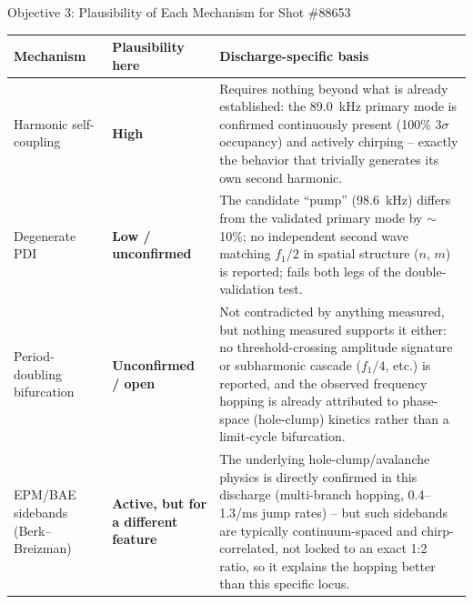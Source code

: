 \documentclass[aspectratio=169]{beamer}
\begin{document}
\begin{frame}{Objective 3: Plausibility of Each Mechanism for Shot \#88653}
    \scriptsize
    \renewcommand{\arraystretch}{1.25}
    \setlength{\tabcolsep}{4pt}
    \begin{tabularx}{\textwidth}{@{}p{2.4cm}p{2.3cm}X@{}}
        \toprule
        \textbf{Mechanism} & \textbf{Plausibility here} & \textbf{Discharge-specific basis} \\
        \midrule
        Harmonic self-coupling &
        \textcolor{green!50!black}{\textbf{High}} &
        Requires nothing beyond what is already established: the \SI{89.0}{\kilo\hertz} primary mode is confirmed continuously present (100\% $3\sigma$ occupancy) and actively chirping -- exactly the behavior that trivially generates its own second harmonic. \\
        \addlinespace
        Degenerate PDI &
        \textcolor{orange!80!black}{\textbf{Low / unconfirmed}} &
        The candidate ``pump'' (\SI{98.6}{\kilo\hertz}) differs from the validated primary mode by $\sim$10\%; no independent second wave matching $f_1/2$ in spatial structure ($n$, $m$) is reported; fails both legs of the double-validation test. \\
        \addlinespace
        Period-doubling bifurcation &
        \textcolor{orange!80!black}{\textbf{Unconfirmed / open}} &
        Not contradicted by anything measured, but nothing measured supports it either: no threshold-crossing amplitude signature or subharmonic cascade ($f_1/4$, etc.) is reported, and the observed frequency hopping is already attributed to phase-space (hole-clump) kinetics rather than a limit-cycle bifurcation. \\
        \addlinespace
        EPM/BAE sidebands (Berk--Breizman) &
        \textcolor{green!50!black}{\textbf{Active, but for a different feature}} &
        The underlying hole-clump/avalanche physics is directly confirmed in this discharge (multi-branch hopping, 0.4--1.3/ms jump rates) -- but such sidebands are typically continuum-spaced and chirp-correlated, not locked to an exact 1:2 ratio, so it explains the hopping better than this specific locus. \\
        \bottomrule
    \end{tabularx}
\end{frame}
\end{document}
